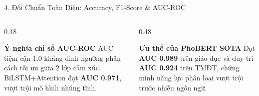 \documentclass[aspectratio=169, 10pt]{beamer}
\begin{document}
\begin{frame}{4. Đối Chuẩn Toàn Diện: Accuracy, F1-Score \& AUC-ROC}
  \vspace{0.18cm}
  \begin{columns}[T, onlytextwidth]
    \begin{column}{0.48\textwidth}
      \begin{block}{\small\textbf{Ý nghĩa chỉ số AUC-ROC}}
        \fontsize{7.5}{9.5}\selectfont
        AUC tiệm cận 1.0 khẳng định ngưỡng phân cách tối ưu giữa 2 lớp cảm xúc. BiLSTM+Attention đạt \textbf{AUC 0.971}, vượt trội mô hình nhúng tĩnh.
      \end{block}
    \end{column}
    \hfill
    \begin{column}{0.48\textwidth}
      \begin{block}{\small\textbf{Ưu thế của PhoBERT SOTA}}
        \fontsize{7.5}{9.5}\selectfont
        Đạt \textbf{AUC 0.989} trên giáo dục và duy trì \textbf{AUC 0.924} trên TMĐT, chứng minh năng lực phân loại vượt trội trước nhiễu ngôn ngữ.
      \end{block}
    \end{column}
  \end{columns}
\end{frame}
\end{document}
